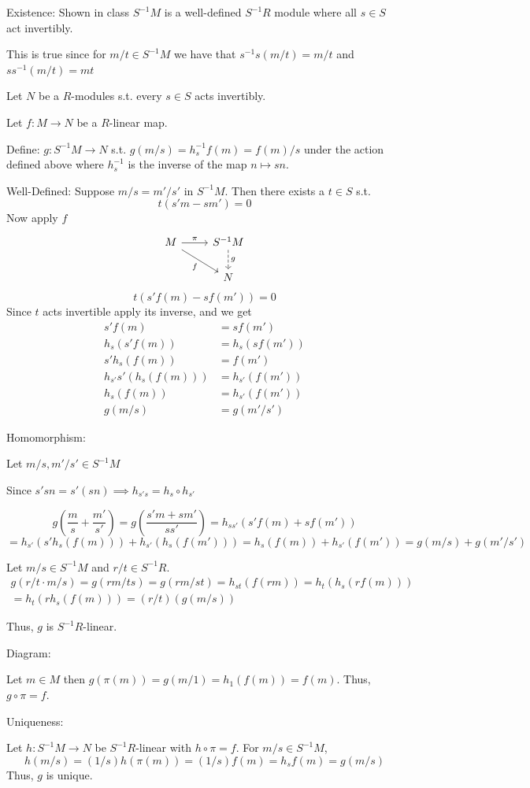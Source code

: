 \documentclass[12pt, letterpaper]{article}
\begin{document}
\begin{problemproof}
    Existence: Shown in class $S^{-1}M$ is a well-defined $S^{-1}R$ module where all $s \in S$ act invertibly.

    This is true since for $m/t \in S^{-1}M$ we have that $s^{-1}s(m/t)=m/t$ and $ss^{-1}(m/t)=mt$

    Let $N$ be a $R$-modules s.t. every $s \in S$ acts invertibly.

    Let $f : M \to N$ be a $R$-linear map.

    Define: $g : S^{-1}M \to N$ s.t. $g(m/s)=h_s^{-1}f(m)=f(m)/s$ under the action defined above where $h_s^{-1}$ is the inverse of the map $n \mapsto sn$.

    Well-Defined: Suppose $m/s=m'/s'$ in $S^{-1}M$. Then there exists a $t \in S$ s.t.
    \[t(s'm-sm')=0\]
    Now apply $f$\[\begin{tikzcd}
	M & {S^{-1}M} \\
	& N
	\arrow["\pi", from=1-1, to=1-2]
	\arrow["f"', from=1-1, to=2-2]
	\arrow["g", dashed, from=1-2, to=2-2]
\end{tikzcd}\]
    \[t(s'f(m)-sf(m'))=0\]
    Since $t$ acts invertible apply its inverse, and we get
    \begin{align*}
        s'f(m)&=sf(m')\\
        h_s(s'f(m))&=h_s(sf(m'))\\
        s'h_s(f(m))&=f(m')\\
        h_{s'}s'(h_s(f(m)))&=h_{s'}(f(m'))\\
        h_s(f(m))&=h_{s'}(f(m'))\\
        g(m/s)&=g(m'/s')
    \end{align*}

    Homomorphism:

    Let $m/s,m'/s' \in S^{-1}M$

    Since $s'sn=s'(sn) \implies h_{s's}=h_{s}\circ h_{s'}$

    \[g(\frac{m}{s}+\frac{m'}{s'})=g(\frac{s'm+sm'}{ss'})=h_{ss'}(s'f(m)+sf(m'))\]
    \[=h_{s'}(s'h_{s}(f(m)))+h_{s'}(h_{s}(f(m')))=h_{s}(f(m))+h_{s'}(f(m'))=g(m/s)+g(m'/s')\]

    Let $m/s \in S^{-1}M$ and $r/t \in S^{-1}R$.
    \begin{align*}
        g(r/t \cdot m/s)=g(rm/ts)=g(rm/st)=h_{st}(f(rm))=h_{t}(h_{s}(rf(m)))\\
        =h_{t}(rh_s(f(m)))=(r/t)(g(m/s))
    \end{align*}

    Thus, $g$ is $S^{-1}R$-linear.

    Diagram:
    
    Let $m \in M$ then $g(\pi(m))=g(m/1)=h_{1}(f(m))=f(m)$. Thus, $g \circ \pi = f$.

    Uniqueness:

    Let $h : S^{-1}M \to N$ be $S^{-1}R$-linear with $h \circ \pi = f$. For $m/s \in S^{-1}M$,
    \[h(m/s)=(1/s)h(\pi(m))=(1/s)f(m)=h_{s}f(m)=g(m/s)\]
    Thus, $g$ is unique.
\end{problemproof}
\end{document}
